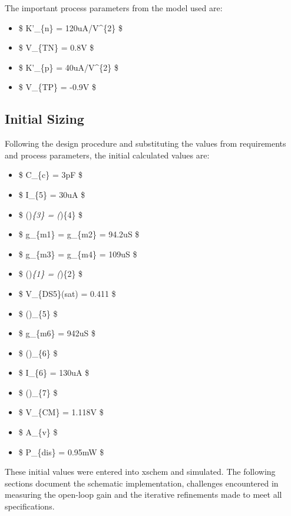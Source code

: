 \documentclass[
]{article}
\providecommand{\tightlist}{%
  \setlength{\itemsep}{0pt}\setlength{\parskip}{0pt}}
\begin{document}
The important process parameters from the model used are:

\begin{itemize}
\tightlist
\item
  \$ K'\_\{n\} = 120uA/V\^{}\{2\} \$
\item
  \$ V\_\{TN\} = 0.8V \$
\item
  \$ K'\_\{p\} = 40uA/V\^{}\{2\} \$
\item
  \$ V\_\{TP\} = -0.9V \$
\end{itemize}

\subsection{Initial Sizing}\label{initial-sizing}

Following the design procedure and substituting the values from
requirements and process parameters, the initial calculated values are:

\begin{itemize}
\tightlist
\item
  \$ C\_\{c\} = 3pF \$
\item
  \$ I\_\{5\} = 30uA \$
\item
  \$ ()\emph{\{3\} = (})\{4\}  \$
\item
  \$ g\_\{m1\} = g\_\{m2\} = 94.2uS \$
\item
  \$ g\_\{m3\} = g\_\{m4\} = 109uS \$
\item
  \$ ()\emph{\{1\} = (})\{2\}  \$
\item
  \$ V\_\{DS5\}(sat) = 0.411 \$
\item
  \$ ()\_\{5\}  \$
\item
  \$ g\_\{m6\} = 942uS \$
\item
  \$ ()\_\{6\}  \$
\item
  \$ I\_\{6\} = 130uA \$
\item
  \$ ()\_\{7\}  \$
\item
  \$ V\_\{CM\} = 1.118V \$
\item
  \$ A\_\{v\}  \$
\item
  \$ P\_\{dis\} = 0.95mW \$
\end{itemize}

These initial values were entered into xschem and simulated. The
following sections document the schematic implementation, challenges
encountered in measuring the open-loop gain and the iterative
refinements made to meet all specifications.
\end{document}
